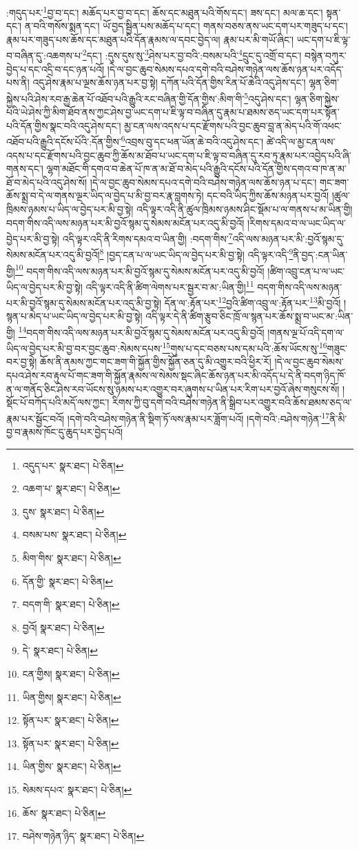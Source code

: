 :གདུད་པར་\footnote{འདུད་པར་  སྣར་ཐང་།  པེ་ཅིན། }བྱ་བ་དང་། མཆོད་པར་བྱ་བ་དང་། ཆོས་དང་མཐུན་པའི་གོས་དང་། ཟས་དང་། མལ་ཆ་དང་། སྟན་དང་། ན་བའི་གསོས་སྨན་དང་། ཡོ་བྱད་སྦྱིན་པས་མཆོད་པ་དང་། གནས་བཅས་ནས་ཡང་དག་པར་གཟུད་པ་དང་། རྣམ་པར་གཟུད་པས་ཆོས་དང་མཐུན་པའི་དོན་རྣམས་ལ་དབང་བྱེད་ལ། རྣམ་པར་མི་གཡོ་ཞིང་། ཡང་དག་པ་ཇི་ལྟ་བ་བཞིན་དུ་:འཆགས་པ་\footnote{འཆག་པ་  སྣར་ཐང་།  པེ་ཅིན། }དང་། :དུས་དུས་སུ་\footnote{དུས་  སྣར་ཐང་།  པེ་ཅིན། }ཤེས་པར་བྱ་བའི་:བསམ་པའི་\footnote{བསམ་པས་  སྣར་ཐང་།  པེ་ཅིན། }དྲུང་དུ་འགྲོ་བ་དང་། བསྙེན་བཀུར་བྱེད་པ་དང་འདྲི་བ་དང་ཉན་པའོ། །དེ་ལ་བྱང་ཆུབ་སེམས་དཔའ་དགེ་བའི་བཤེས་གཉེན་ལས་ཆོས་ཉན་པར་འདོད་པས་ནི། འདུ་ཤེས་རྣམ་པ་ལྔས་ཆོས་ཉན་པར་བྱ་སྟེ། དཀོན་པའི་དོན་གྱིས་རིན་པོ་ཆེའི་འདུ་ཤེས་དང་། ལྷན་ཅིག་སྐྱེས་པའི་ཤེས་རབ་རྒྱ་ཆེན་པོ་འཐོབ་པའི་རྒྱུའི་རང་བཞིན་གྱི་དོན་གྱིས་:མིག་གི་\footnote{མིག་གིས་  སྣར་ཐང་།  པེ་ཅིན། }འདུ་ཤེས་དང་། ལྷན་ཅིག་སྐྱེས་པའི་ཡེ་ཤེས་ཀྱི་མིག་ཐོབ་ནས་ཀྱང་ཤེས་བྱ་ཡང་དག་པ་ཇི་ལྟ་བ་བཞིན་དུ་རྣམ་པ་ཐམས་ཅད་ཡང་དག་པར་སྟོན་པའི་དོན་གྱིས་སྣང་བའི་འདུ་ཤེས་དང་། མྱ་ངན་ལས་འདས་པ་དང་རྫོགས་པའི་བྱང་ཆུབ་བླ་ན་མེད་པའི་གོ་འཕང་འཐོབ་པའི་རྒྱུའི་དངོས་པོའི་:དོན་གྱིས་\footnote{དོན་གྱི་  སྣར་ཐང་།  པེ་ཅིན། }འབྲས་བུ་དང་ཕན་ཡོན་ཆེ་བའི་འདུ་ཤེས་དང་། ཚེ་འདི་ལ་མྱ་ངན་ལས་འདས་པ་དང་རྫོགས་པའི་བྱང་ཆུབ་ཀྱི་ཆོས་མ་ཐོབ་པ་ཡང་དག་པ་ཇི་ལྟ་བ་བཞིན་དུ་རབ་ཏུ་རྣམ་པར་འབྱེད་པའི་ཞི་གནས་དང་། ལྷག་མཐོང་གི་དགའ་བ་ཆེན་པོ་ཁ་ན་མ་ཐོ་བ་མེད་པའི་རྒྱུའི་དངོས་པའི་དོན་གྱིས་དགའ་བ་ཁ་ན་མ་ཐོ་བ་མེད་པའི་འདུ་ཤེས་སོ། །དེ་ལ་བྱང་ཆུབ་སེམས་དཔའ་དགེ་བའི་བཤེས་གཉེན་ལས་ཆོས་ཉན་པ་དང་། གང་ཟག་ཆོས་སྨྲ་བ་དེ་ལ་གནས་ལྔར་ཡིད་ལ་བྱེད་པ་མི་བྱ་བར་རྣ་བླགས་ཏེ། དང་བའི་ཡིད་ཀྱིས་ཆོས་མཉན་པར་བྱའོ། །ཚུལ་ཁྲིམས་ཉམས་པ་ཡིད་ལ་བྱེད་པར་མི་བྱ་སྟེ། འདི་ལྟར་འདི་ནི་ཚུལ་ཁྲིམས་ཉམས་ཤིང་སྡོམ་པ་ལ་གནས་པ་མ་ཡིན་གྱི། བདག་གིས་འདི་ལས་མཉན་པར་མི་བྱའོ་སྙམ་དུ་སེམས་མངོན་པར་འདུ་མི་བྱའོ། །རིགས་དམའ་བ་ལ་ཡང་ཡིད་ལ་བྱེད་པར་མི་བྱ་སྟེ། འདི་ལྟར་འདི་ནི་རིགས་དམའ་བ་ཡིན་གྱི། :བདག་གིས་\footnote{བདག་གི་  སྣར་ཐང་།  པེ་ཅིན། }འདི་ལས་མཉན་པར་མི་:བྱའོ་སྙམ་དུ་སེམས་མངོན་པར་འདུ་མི་བྱའོ།\footnote{བྱའོ།  སྣར་ཐང་།  པེ་ཅིན། } །བྱད་ངན་པ་ལ་ཡང་ཡིད་ལ་བྱེད་པར་མི་བྱ་སྟེ། འདི་ལྟར་འདི་\footnote{དེ་  སྣར་ཐང་།  པེ་ཅིན། }ནི་བྱད་:ངན་ཡིན་གྱི།\footnote{ངན་གྱིས།  སྣར་ཐང་།  པེ་ཅིན། } བདག་གིས་འདི་ལས་མཉན་པར་མི་བྱའོ་སྙམ་དུ་སེམས་མངོན་པར་འདུ་མི་བྱའོ། །ཚིག་འབྲུ་ངན་པ་ལ་ཡང་ཡིད་ལ་བྱེད་པར་མི་བྱ་སྟེ། འདི་ལྟར་འདི་ནི་ཚིག་ལེགས་པར་སྦྱར་བ་མ་:ཡིན་གྱི།\footnote{ཡིན་གྱིས།  སྣར་ཐང་།  པེ་ཅིན། } བདག་གིས་འདི་ལས་མཉན་པར་མི་བྱའོ་སྙམ་དུ་སེམས་མངོན་པར་འདུ་མི་བྱ་སྟེ། དོན་ལ་:རྟོན་པར་\footnote{སྟོན་པར་  སྣར་ཐང་།  པེ་ཅིན། }བྱའི་ཚིག་འབྲུ་ལ་:རྟོན་པར་\footnote{སྟོན་པར་  སྣར་ཐང་།  པེ་ཅིན། }མི་བྱའོ། །སྙན་པ་མེད་པ་ཡང་ཡིད་ལ་བྱེད་པར་མི་བྱ་སྟེ། འདི་ལྟར་དེ་ནི་ཚིག་རྩུབ་ཅིང་ཁྲོ་ལ་སྙན་པར་ཆོས་སྨྲ་བ་ཡང་མ་:ཡིན་གྱི། \footnote{ཡིན་གྱིས་  སྣར་ཐང་།  པེ་ཅིན། }བདག་གིས་འདི་ལས་མཉན་པར་མི་བྱའོ་སྙམ་དུ་སེམས་མངོན་པར་འདུ་མི་བྱའོ། །གནས་ལྔ་པོ་འདི་དག་ལ་ཡིད་ལ་བྱེད་པར་མི་བྱ་བར་བྱང་ཆུབ་:སེམས་དཔས་\footnote{སེམས་དཔའ་  སྣར་ཐང་།  པེ་ཅིན། }གུས་པ་དང་བཅས་པས་དམ་པའི་:ཆོས་ཡོངས་སུ་\footnote{ཆོས་  སྣར་ཐང་།  པེ་ཅིན། }གཟུང་བར་བྱ་སྟེ། ཆོས་ནི་ནམས་ཀྱང་གང་ཟག་གི་སྐྱོན་གྱིས་སྐྱོན་ཅན་དུ་མི་འགྱུར་བའི་ཕྱིར་རོ། །དེ་ལ་བྱང་ཆུབ་སེམས་དཔའ་ཤེས་རབ་རྟུལ་པོ་གང་ཟག་གི་སྐྱོན་རྣམས་ལ་སེམས་སྡང་ཞིང་ཆོས་ཉན་པར་མི་འདོད་པ་དེ་ནི་བདག་ཉིད་ཁོ་ན་ལ་གནོད་ཅིང་ཤེས་རབ་ཡོངས་སུ་ཉམས་པར་འགྱུར་བར་ཞུགས་པ་ཡིན་པར་རིག་པར་བྱའོ་ཞེས་གསུངས་སོ། །སྡོང་པོ་བཀོད་པའི་མདོ་ལས་ཀྱང་། རིགས་ཀྱི་བུ་དགེ་བའི་བཤེས་གཉེན་ནི་སྒྲིབ་པར་འགྱུར་བའི་ཆོས་ཐམས་ཅད་ལ་རྣམ་པར་སྦྱོང་བའོ། །དགེ་བའི་བཤེས་གཉེན་ནི་སྡིག་ཏོ་ལས་རྣམ་པར་ཟློག་པའོ། །དགེ་བའི་:བཤེས་གཉེན་\footnote{བཤེས་གཉེན་ཉིད་  སྣར་ཐང་།  པེ་ཅིན། }ནི་མི་བྱ་བ་རྣམས་ཁོང་དུ་ཆུད་པར་བྱེད་པའོ། 